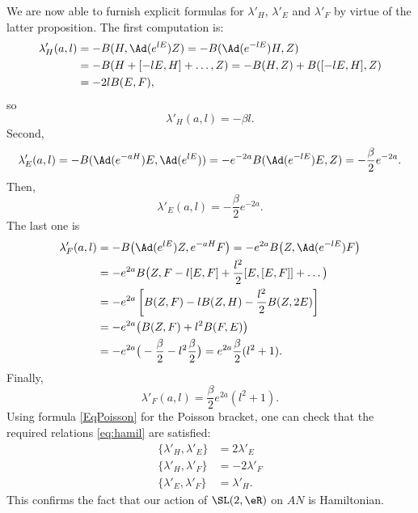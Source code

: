 We are now able to furnish explicit formulas for $\lambda'_H$, $\lambda'_E$ and $\lambda'_F$ by virtue of the latter proposition.  The first computation is:
\begin{equation}
\begin{aligned}
  \lambda'_H(a,l)&=-B(H,\Ad(e^{lE})Z)
                =-B( \Ad(e^{-lE})H,Z )\\
		&=-B(H+[-lE,H]+\ldots,Z)
		=-B(H,Z)+B([-lE,H],Z)\\
		&=-2lB(E,F),
\end{aligned}
\end{equation}
so
\begin{equation}   \label{EqlamHal}
  \lambda'_H(a,l)=-\beta l.
\end{equation}
Second,
\begin{equation}
  \lambda'_E(a,l)=-B(\Ad(e^{-aH})E,\Ad(e^{lE}))
		=-e^{-2a}B(\Ad(e^{-lE})E,Z)
		=-\frac{\beta}{2}e^{-2a}.
\end{equation}
Then,
\begin{equation}  \label{EqlamEal}
\lambda'_E(a,l)=-\frac{\beta}{2}e^{-2a}.
\end{equation}
The last one is
\begin{equation}
\begin{aligned}
\lambda'_F(a,l)&=-B\big(  \Ad(e^{lE})Z,e^{-aH}F  \big)
              =-e^{2a}B\big(Z,  \Ad(e^{-lE})F   \big)\\
	      &=-e^{2a}B\big(Z, F-l[E,F] +\frac{l^2}{2} [E,[E,F]]+\ldots  \big)\\
	      &=-e^{2a}\left[     B(Z,F)-lB(Z,H)-\frac{l^2}{2}B(Z,2E)        \right]\\
	      &=-e^{2a}\big(  B(Z,F)+l^2B(F,E)   \big)\\
	      &=-e^{2a}\big(  -\frac{\beta}{2}-l^2\frac{\beta}{2}   \big)
	      =e^{2a}\frac{\beta}{2}(l^2+1).
\end{aligned}
\end{equation}
Finally,
\begin{equation}  \label{EqlamFal}
\lambda'_F(a,l)=\frac{\beta}{2}e^{2a}(l^2+1).
\end{equation}
Using formula \eqref{EqPoisson} for the Poisson bracket, one can check that the required relations \eqref{eq:hamil} are satisfied:
\begin{subequations}  \label{pg:explic_com_lamb}
\begin{align}
  \{\lambda'_H,\lambda'_E\}&=2\lambda'_E\\
  \{\lambda'_H,\lambda'_F\}&=-2\lambda'_F\\
  \{\lambda'_E,\lambda'_F\}&=\lambda'_H.
\end{align}
\end{subequations}
This confirms the fact that our action of $\SL(2,\eR)$ on $AN$ is Hamiltonian.

